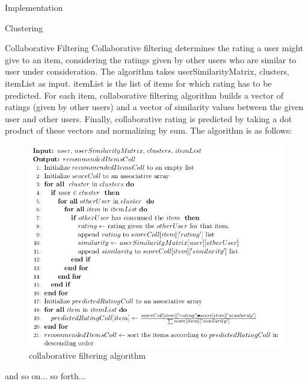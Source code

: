 \documentclass{report}
\begin{document}
\begin{projChapter}{Implementation}
\begin{projSection}{Clustering}
\end{projSection}
\begin{projSection}{Collaborative Filtering}
            Collaborative filtering determines the rating a user might give to an item, considering the ratings given by other users who are similar to user under consideration. The algorithm takes userSimilarityMatrix, clusters, itemList as input. itemList is the list of items for which rating has to be predicted. For each item, collaborative filtering algorithm builds a vector of ratings (given by other users) and a vector of similarity values between the given user and other users. Finally, collaborative rating is predicted by taking a dot product of these vectors and normalizing by sum. The algorithm is as follows:
            \begin{figure}[ht!]
\centering
\includegraphics[scale=0.5]{images/collaborative.png}
\caption{collaborative filtering algorithm}
\label{collaborative}
\end{figure}

\end{projSection}
\end{projChapter}

\begin{projChapter}{and so on...}
        so forth...
    \end{projChapter}
\end{document}
